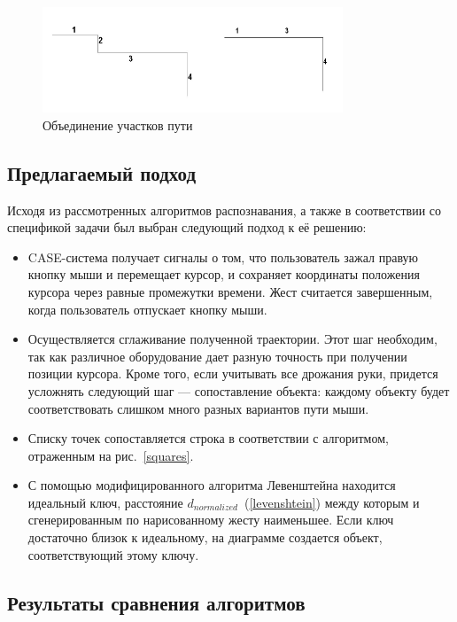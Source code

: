 \documentclass[a5paper]{article}
\begin{document}
\begin{figure} [ht]
  \begin{center}
    \includegraphics[width=0.8\textwidth, bb=0 0 500 200]{04-qt.png}
    \caption{Объединение участков пути}
    \label{qt}
  \end{center}
\end{figure}

\subsection{Предлагаемый подход}

Исходя из рассмотренных алгоритмов распознавания, а также в соответствии со спецификой задачи был выбран следующий подход к её решению:

\begin{itemize}
  \item CASE-система получает сигналы о том, что пользователь зажал правую кнопку мыши и перемещает курсор, и сохраняет координаты положения курсора
через равные промежутки времени. Жест считается завершенным, когда пользователь отпускает кнопку мыши.
  \item Осуществляется сглаживание полученной траектории. Этот шаг необходим, так как различное оборудование дает разную точность при получении 
позиции курсора. Кроме того, если учитывать все дрожания руки, придется усложнять следующий шаг --- сопоставление объекта: каждому объекту
будет соответствовать слишком много разных вариантов пути мыши.
  \item Списку точек сопоставляется строка в соответствии с алгоритмом, отраженным на рис.~\ref{squares}.
  \item С помощью модифицированного алгоритма Левенштейна находится идеальный ключ, расстояние $d_{normalized}$~(\ref{levenshtein}) между которым и 
сгенерированным по нарисованному жесту наименьшее. Если ключ достаточно близок к идеальному, на диаграмме создается объект, соответствующий этому ключу.
\end{itemize}

\subsection{Результаты сравнения алгоритмов}
\end{document}
